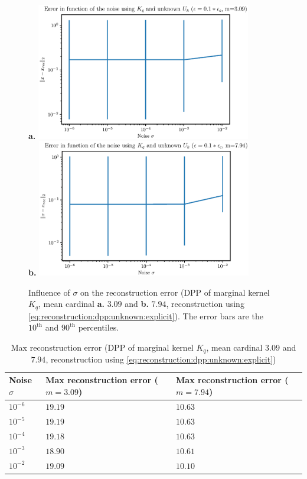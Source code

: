 \documentclass{article}
\begin{document}
\begin{figure}[ht]
\centering
\textbf{a.} \includegraphics[height=6cm]{error_function_noise_Kq_unknown_Uk_m_3.eps} \\
\textbf{b.} \includegraphics[height=6cm]{error_function_noise_Kq_unknown_Uk_m_8.eps}
\caption{Influence of $\sigma$ on the reconstruction error (DPP of marginal kernel $K_q$, mean cardinal \textbf{a.} $3.09$ and \textbf{b.} $7.94$, reconstruction using \eqref{eq:reconstruction:dpp:unknown:explicit}). The error bars are the $10^\text{th}$ and $90^\text{th}$ percentiles.} \label{fig:Kq:recerror:unknownUk}
\end{figure}


\begin{table}[ht]
  \caption{Max reconstruction error (DPP of marginal kernel $K_q$, mean cardinal $3.09$ and $7.94$, reconstruction using \eqref{eq:reconstruction:dpp:unknown:explicit})}
  \label{tab:Kq:maxrecerror:unknownUk}
  \centering
  \begin{tabular}{lll}
    \toprule
    Noise $\sigma$ &  Max reconstruction error ($m=3.09$) &  Max reconstruction error ($m=7.94$) \\
    \midrule
    $10^{-6}$ & $19.19$ & $10.63$\\
    $10^{-5}$ & $19.19$ & $10.63$\\
    $10^{-4}$ & $19.18$ & $10.63$\\
		$10^{-3}$ & $18.90$ & $10.61$\\
		$10^{-2}$ & $19.09$ & $10.10$\\
    \bottomrule
  \end{tabular}
\end{table}
\end{document}
